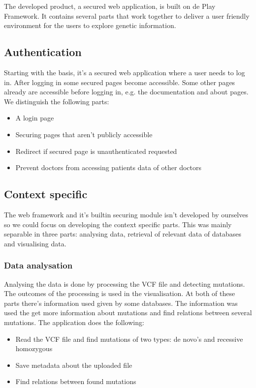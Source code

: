 The developed product, a secured web application, is built on de Play Framework. It contains several parts that work together to deliver a user friendly environment for the users to explore genetic information.

\subsection{Authentication}

Starting with the basis, it's a secured web application where a user needs to log in. After logging in some secured pages become accessible. Some other pages already are accessible before logging in, e.g. the documentation and about pages. We distinguish the following parts:

\begin{itemize}
  \item A login page
  \item Securing pages that aren't publicly accessible
  \item Redirect if secured page is unauthenticated requested
  \item Prevent doctors from accessing patients data of other doctors
\end{itemize}

\subsection{Context specific}

The web framework and it's builtin securing module isn't developed by ourselves so we could focus on developing the context specific parts. This was mainly separable in three parts: analysing data, retrieval of relevant data of databases and visualising data.

\subsubsection{Data analysation}

Analysing the data is done by processing the VCF file and detecting mutations. The outcomes of the processing is used in the visualisation. At both of these parts there's information used given by some databases. The information was used the get more information about mutations and find relations between several mutations. The application does the following:

\begin{itemize}
  \item Read the VCF file and find mutations of two types: de novo's and recessive homozygous
  \item Save metadata about the uploaded file
  \item Find relations between found mutations
\end{itemize}

